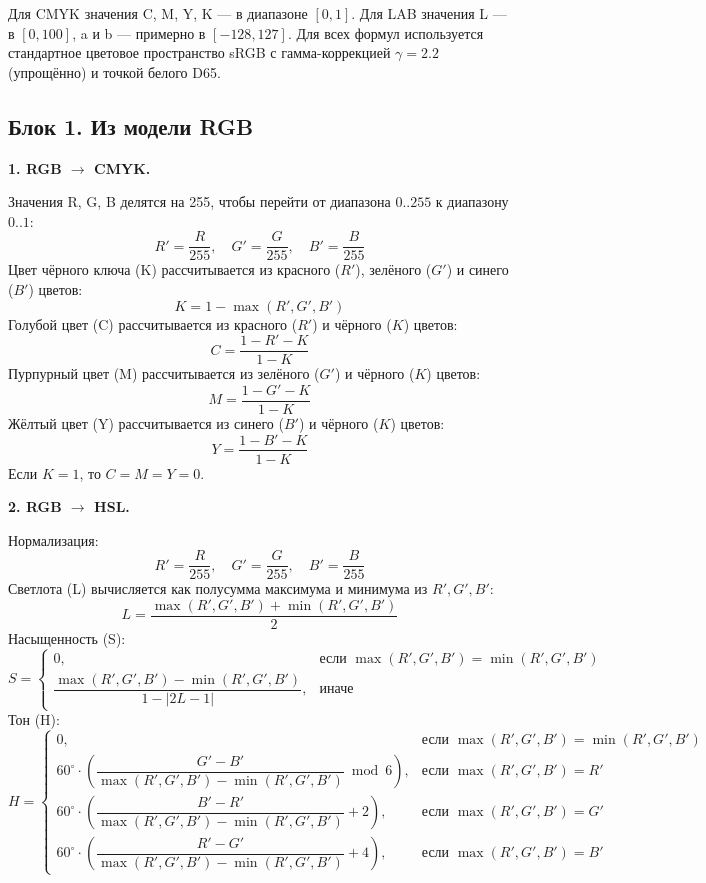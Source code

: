 \documentclass[12pt,a4paper]{article}
\begin{document}
Для CMYK значения C, M, Y, K --- в диапазоне \([0, 1]\).
Для LAB значения L --- в \([0, 100]\), a и b --- примерно в \([-128, 127]\).
Для всех формул используется стандартное цветовое пространство sRGB с гамма-коррекцией \(\gamma = 2.2\) (упрощённо) и точкой белого D65.

\subsection{Блок 1. Из модели RGB}

\textbf{1. RGB \(\to\) CMYK.}

Значения R, G, B делятся на 255, чтобы перейти от диапазона \(0..255\) к диапазону \(0..1\):
\[
R' = \frac{R}{255},\quad G' = \frac{G}{255},\quad B' = \frac{B}{255}
\]
Цвет чёрного ключа (K) рассчитывается из красного (\(R'\)), зелёного (\(G'\)) и синего (\(B'\)) цветов:
\[
K = 1 - \max(R', G', B')
\]
Голубой цвет (C) рассчитывается из красного (\(R'\)) и чёрного (\(K\)) цветов:
\[
C = \frac{1 - R' - K}{1 - K}
\]
Пурпурный цвет (M) рассчитывается из зелёного (\(G'\)) и чёрного (\(K\)) цветов:
\[
M = \frac{1 - G' - K}{1 - K}
\]
Жёлтый цвет (Y) рассчитывается из синего (\(B'\)) и чёрного (\(K\)) цветов:
\[
Y = \frac{1 - B' - K}{1 - K}
\]
Если \(K = 1\), то \(C = M = Y = 0\).

\textbf{2. RGB \(\to\) HSL.}

Нормализация:
\[
R' = \frac{R}{255},\quad G' = \frac{G}{255},\quad B' = \frac{B}{255}
\]
Светлота (L) вычисляется как полусумма максимума и минимума из \(R', G', B'\):
\[
L = \frac{\max(R', G', B') + \min(R', G', B')}{2}
\]
Насыщенность (S):
\[
S = \begin{cases}
0, & \text{если } \max(R', G', B') = \min(R', G', B') \\[8pt]
\dfrac{\max(R', G', B') - \min(R', G', B')}{1 - |2L - 1|}, & \text{иначе}
\end{cases}
\]
Тон (H):
\[
H = \begin{cases}
0, & \text{если } \max(R', G', B') = \min(R', G', B') \\[8pt]
60^\circ \cdot \left( \dfrac{G' - B'}{\max(R', G', B') - \min(R', G', B')} \bmod 6 \right), & \text{если } \max(R', G', B') = R' \\[12pt]
60^\circ \cdot \left( \dfrac{B' - R'}{\max(R', G', B') - \min(R', G', B')} + 2 \right), & \text{если } \max(R', G', B') = G' \\[12pt]
60^\circ \cdot \left( \dfrac{R' - G'}{\max(R', G', B') - \min(R', G', B')} + 4 \right), & \text{если } \max(R', G', B') = B'
\end{cases}
\]
\end{document}
